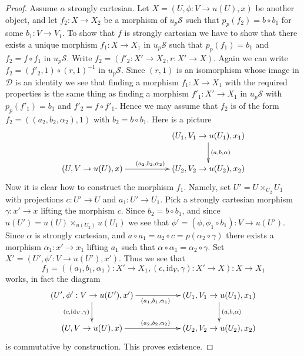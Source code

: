 \begin{proof}
\medskip\noindent
Assume $\alpha$ strongly cartesian.
Let $X = (U, \phi : V \to u(U), x)$ be another object, and let
$f_2 : X \to X_2$ be a morphism of $u_p\mathcal{S}$
such that $p_p(f_2) = b \circ b_1$ for some $b_1 : V \to V_1$.
To show that $f$ is strongly cartesian we have to show
that there exists a unique morphism $f_1 : X \to X_1$ in $u_p\mathcal{S}$
such that $p_p(f_1) = b_1$ and $f_2 = f \circ f_1$ in $u_p\mathcal{S}$.
Write $f_2 = (f'_2 : X' \to X_2, r : X' \to X)$. Again we can write
$f_2 = (f'_2, 1) \circ (r, 1)^{-1}$ in $u_p\mathcal{S}$. Since $(r, 1)$
is an isomorphism whose image in $\mathcal{D}$ is an identity we
see that finding a morphism $f_1 : X \to X_1$ with the required
properties is the same thing as finding a morphism $f'_1 : X' \to X_1$
in $u_p\mathcal{S}$ with $p_p(f'_1) = b_1$ and $f'_2 = f \circ f'_1$.
Hence we may assume that $f_2$ is of the form
$f_2 = ((a_2, b_2, \alpha_2), 1)$ with $b_2 = b \circ b_1$. Here is
a picture
$$
\xymatrix{
& & (U_1, V_1 \to u(U_1), x_1) \ar[d]^{(a, b, \alpha)} \\
(U, V \to u(U), x) \ar[rr]^{(a_2, b_2, \alpha_2)} & &
(U_2, V_2 \to u(U_2), x_2)
}
$$
Now it is clear how to construct the morphism $f_1$.
Namely, set $U' = U \times_{U_2} U_1$ with projections
$c : U' \to U$ and $a_1 : U' \to U_1$.
Pick a strongly cartesian morphism $\gamma : x' \to x$
lifting the morphism $c$. Since $b_2 = b \circ b_1$,
and since $u(U') = u(U) \times_{u(U_2)} u(U_1)$ we see that
$\phi' = (\phi, \phi_1 \circ b_1) : V \to u(U')$. Since
$\alpha$ is strongly cartesian, and
$a \circ a_1 = a_2 \circ c = p(\alpha_2 \circ \gamma)$
there exists a morphism
$\alpha_1 : x' \to x_1$ lifting $a_1$ such that
$\alpha \circ \alpha_1 = \alpha_2 \circ \gamma$.
Set $X' = (U', \phi' : V \to u(U'), x')$.
Thus we see that
$$
f_1 =
((a_1, b_1, \alpha_1) : X' \to X_1, (c, \text{id}_V, \gamma) : X' \to X) :
X \longrightarrow X_1
$$
works, in fact the diagram
$$
\xymatrix{
(U', \phi' : V \to u(U'), x')
\ar[d]_{(c, \text{id}_V, \gamma)}
\ar[rr]_{(a_1, b_1, \alpha_1)}
& & (U_1, V_1 \to u(U_1), x_1) \ar[d]^{(a, b, \alpha)} \\
(U, V \to u(U), x) \ar[rr]^{(a_2, b_2, \alpha_2)} & &
(U_2, V_2 \to u(U_2), x_2)
}
$$
is commutative by construction. This proves existence.


\end{proof}
